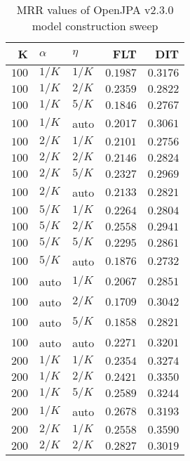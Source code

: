 
\begin{table}
\begin{spacing}{1.2}
\centering
\caption{MRR values of OpenJPA v2.3.0 model construction sweep}
\label{table:openjpa_model_sweep}
\vspace{0.2em}
\parbox{.45\linewidth}{\centering \begin{tabular}{rll|rr}
\toprule
    K &  $\alpha$ &    $\eta$ & FLT &   DIT \\
\midrule
$100$ &  $1/K$ &  $1/K$ &         $0.1987$ & $0.3176$ \\
$100$ &  $1/K$ &  $2/K$ &         $0.2359$ & $0.2822$ \\
$100$ &  $1/K$ &  $5/K$ &         $0.1846$ & $0.2767$ \\
$100$ &  $1/K$ &   auto &         $0.2017$ & $0.3061$ \\
$100$ &  $2/K$ &  $1/K$ &         $0.2101$ & $0.2756$ \\
$100$ &  $2/K$ &  $2/K$ &         $0.2146$ & $0.2824$ \\
$100$ &  $2/K$ &  $5/K$ &         $0.2327$ & $0.2969$ \\
$100$ &  $2/K$ &   auto &         $0.2133$ & $0.2821$ \\
$100$ &  $5/K$ &  $1/K$ &         $0.2264$ & $0.2804$ \\
$100$ &  $5/K$ &  $2/K$ &         $0.2558$ & $0.2941$ \\
$100$ &  $5/K$ &  $5/K$ &         $0.2295$ & $0.2861$ \\
$100$ &  $5/K$ &   auto &         $0.1876$ & $0.2732$ \\
$100$ &   auto &  $1/K$ &         $0.2067$ & $0.2851$ \\
$100$ &   auto &  $2/K$ &         $0.1709$ & $0.3042$ \\
$100$ &   auto &  $5/K$ &         $0.1858$ & $0.2821$ \\
$100$ &   auto &   auto &         $0.2271$ & $0.3201$ \\
$200$ &  $1/K$ &  $1/K$ &         $0.2354$ & $0.3274$ \\
$200$ &  $1/K$ &  $2/K$ &         $0.2421$ & $0.3350$ \\
$200$ &  $1/K$ &  $5/K$ &         $0.2589$ & $0.3244$ \\
$200$ &  $1/K$ &   auto &         $0.2678$ & $0.3193$ \\
$200$ &  $2/K$ &  $1/K$ &         $0.2558$ & $0.3590$ \\
$200$ &  $2/K$ &  $2/K$ &         $0.2827$ & $0.3019$ \\

\end{tabular}}
\end{spacing}
\end{table}
